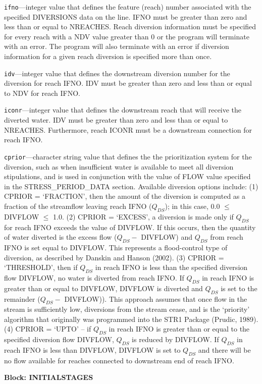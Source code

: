 \begin{description}
\item \texttt{ifno}---integer value that defines the feature (reach) number associated with the specified DIVERSIONS data on the line. IFNO must be greater than zero and less than or equal to NREACHES.  Reach diversion information must be specified for every reach with a NDV value greater than 0 or the program will terminate with an error.  The program will also terminate with an error if diversion information for a given reach diversion is specified more than once.

\item \texttt{idv}---integer value that defines the downstream diversion number for the diversion for reach IFNO. IDV must be greater than zero and less than or equal to NDV for reach IFNO.

\item \texttt{iconr}---integer value that defines the downstream reach that will receive the diverted water. IDV must be greater than zero and less than or equal to NREACHES. Furthermore, reach  ICONR must be a downstream connection for reach IFNO.

\item \texttt{cprior}---character string value that defines the the prioritization system for the diversion, such as when insufficient water is available to meet all diversion stipulations, and is used in conjunction with the value of FLOW value specified in the STRESS\_PERIOD\_DATA section. Available diversion options include:  (1) CPRIOR = `FRACTION', then the amount of the diversion is computed as a fraction of the streamflow leaving reach IFNO ($Q_{DS}$); in this case, 0.0 $\le$ DIVFLOW $\le$ 1.0.  (2) CPRIOR = `EXCESS', a diversion is made only if $Q_{DS}$ for reach IFNO exceeds the value of DIVFLOW. If this occurs, then the quantity of water diverted is the excess flow ($Q_{DS} -$ DIVFLOW) and $Q_{DS}$ from reach IFNO is set equal to DIVFLOW. This represents a flood-control type of diversion, as described by Danskin and Hanson (2002). (3) CPRIOR = `THRESHOLD', then if $Q_{DS}$ in reach IFNO is less than the specified diversion flow DIVFLOW, no water is diverted from reach IFNO. If $Q_{DS}$ in reach IFNO is greater than or equal to DIVFLOW, DIVFLOW is diverted and $Q_{DS}$ is set to the remainder ($Q_{DS} -$ DIVFLOW)). This approach assumes that once flow in the stream is sufficiently low, diversions from the stream cease, and is the `priority' algorithm that originally was programmed into the STR1 Package (Prudic, 1989).  (4) CPRIOR = `UPTO' -- if $Q_{DS}$ in reach IFNO is greater than or equal to the specified diversion flow DIVFLOW, $Q_{DS}$ is reduced by DIVFLOW. If $Q_{DS}$ in reach IFNO is less than DIVFLOW, DIVFLOW is set to $Q_{DS}$ and there will be no flow available for reaches connected to downstream end of reach IFNO.

\end{description}
\item \textbf{Block: INITIALSTAGES}

